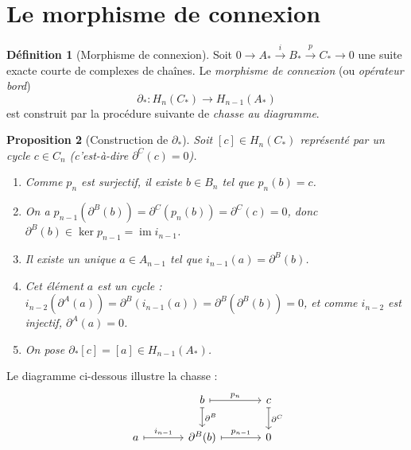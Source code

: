 \documentclass[12pt,a4paper,openany]{book}
\theoremstyle{definition}
\newtheorem{definition}{Définition}[chapter]
\theoremstyle{plain}
\newtheorem{proposition}[definition]{Proposition}
\theoremstyle{remark}
\DeclareMathOperator{\im}{im}
\begin{document}
\section{Le morphisme de connexion}\label{sec:morphisme-connexion}

\begin{definition}[Morphisme de connexion]\label{def:morphisme-connexion}
Soit $0 \to A_* \xrightarrow{i} B_* \xrightarrow{p} C_* \to 0$ une suite exacte courte de
complexes de chaînes. Le \emph{morphisme de connexion} (ou \emph{opérateur bord})
\[
  \partial_* \colon H_n(C_*) \longrightarrow H_{n-1}(A_*)
\]
est construit par la procédure suivante de \emph{chasse au diagramme}.
\end{definition}

\begin{proposition}[Construction de $\partial_*$]\label{prop:construction-connexion}
Soit $[c] \in H_n(C_*)$ représenté par un cycle $c \in C_n$ (c'est-à-dire $\partial^C(c) = 0$).
\begin{enumerate}[label=(\roman*)]
  \item Comme $p_n$ est surjectif, il existe $b \in B_n$ tel que $p_n(b) = c$.
  \item On a $p_{n-1}(\partial^B(b)) = \partial^C(p_n(b)) = \partial^C(c) = 0$, donc
  $\partial^B(b) \in \ker p_{n-1} = \im i_{n-1}$.
  \item Il existe un unique $a \in A_{n-1}$ tel que $i_{n-1}(a) = \partial^B(b)$.
  \item Cet élément $a$ est un cycle : $i_{n-2}(\partial^A(a)) = \partial^B(i_{n-1}(a)) = \partial^B(\partial^B(b)) = 0$,
  et comme $i_{n-2}$ est injectif, $\partial^A(a) = 0$.
  \item On pose $\partial_*[c] = [a] \in H_{n-1}(A_*)$.
\end{enumerate}
\end{proposition}

Le diagramme ci-dessous illustre la chasse :
\[
\begin{tikzcd}[column sep=large]
  & b \ar[r, mapsto, "p_n"] \ar[d, mapsto, "\partial^B"] & c \ar[d, mapsto, "\partial^C"] \\
  a \ar[r, mapsto, "i_{n-1}"] & \partial^B(b) \ar[r, mapsto, "p_{n-1}"] & 0
\end{tikzcd}
\]
\end{document}
